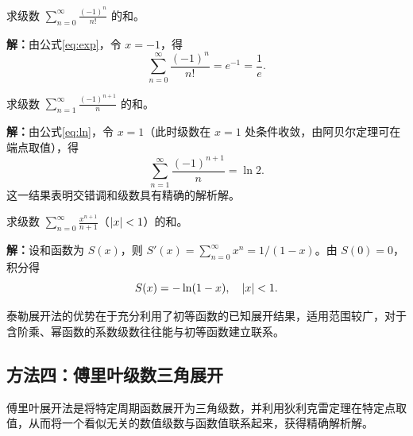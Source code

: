 \begin{example}[利用指数函数展开]
求级数 $\displaystyle\sum_{n=0}^{\infty} \frac{(-1)^n}{n!}$ 的和。

\textbf{解：}由公式\eqref{eq:exp}，令 $x = -1$，得
\begin{equation}
\sum_{n=0}^{\infty} \frac{(-1)^n}{n!} = e^{-1} = \frac{1}{e}.
\end{equation}
\end{example}

\begin{example}[利用对数展开与特殊值]
求级数 $\displaystyle\sum_{n=1}^{\infty} \frac{(-1)^{n+1}}{n}$ 的和。

\textbf{解：}由公式\eqref{eq:ln}，令 $x = 1$（此时级数在 $x = 1$ 处条件收敛，由阿贝尔定理可在端点取值），得
\begin{equation}
\sum_{n=1}^{\infty} \frac{(-1)^{n+1}}{n} = \ln 2.
\end{equation}
这一结果表明交错调和级数具有精确的解析解。
\end{example}

\begin{example}[逐项积分获得解析解]
求级数 $\displaystyle\sum_{n=0}^{\infty} \frac{x^{n+1}}{n+1}$（$\left|x\right| < 1$）的和。

\textbf{解：}设和函数为 $S(x)$，则 $\displaystyle S'(x) = \sum_{n=0}^{\infty} x^n = 1/(1-x)$。由 $S(0) = 0$，积分得
\begin{equation}
S(x) = -\ln(1-x), \quad \left|x\right| < 1.
\end{equation}
\end{example}

泰勒展开法的优势在于充分利用了初等函数的已知展开结果，适用范围较广，对于含阶乘、幂函数的系数级数往往能与初等函数建立联系。

\subsection{方法四：傅里叶级数三角展开}

傅里叶展开法是将特定周期函数展开为三角级数，并利用狄利克雷定理在特定点取值，从而将一个看似无关的数值级数与函数值联系起来，获得精确解析解。

